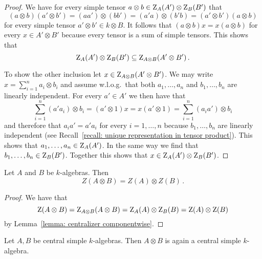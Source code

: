 \begin{proof}
  We have for every simple tensor $a \otimes b \in \operatorname{Z}_A(A') \otimes \operatorname{Z}_B(B')$ that
  \[
      (a \otimes b) (a' \otimes b')
    = (aa') \otimes (bb')
    = (a'a) \otimes (b'b)
    = (a' \otimes b')(a \otimes b)
  \]
  for every simple tensor $a' \otimes b' \in k \otimes B$.
  It follows that $(a \otimes b) x = x (a \otimes b)$ for every $x \in A' \otimes B'$ because every tensor is a sum of simple tensors.
  This shows that
  \[
              \operatorname{Z}_A(A') \otimes \operatorname{Z}_B(B')
    \subseteq \operatorname{Z}_{A \otimes B}(A' \otimes B') \,.
  \]
  
  To show the other inclusion let $x \in \operatorname{Z}_{A \otimes B}(A' \otimes B')$.
  We may write $x = \sum_{i=1}^n a_i \otimes b_i$ and assume w.l.o.g.\ that both $a_1, \dotsc, a_n$ and $b_1, \dotsc, b_n$ are linearly independent.
  For every $a' \in A'$ we then have that
  \[
      \sum_{i=1}^n (a' a_i) \otimes b_i
    = (a' \otimes 1) x
    = x (a' \otimes 1)
    = \sum_{i=1}^n (a_i a') \otimes b_i
  \]
  and therefore that $a_i a' = a' a_i$ for every $i = 1, \dotsc, n$ because $b_1, \dotsc, b_n$ are linearly independent (see Recall~\ref{recall: unique representation in tensor product}).
  This shows that $a_1, \dotsc, a_n \in \operatorname{Z}_{A}(A')$.
  In the same way we find that $b_1, \dotsc, b_n \in \operatorname{Z}_{B}(B')$.
  Together this shows that $x \in \operatorname{Z}_A(A') \otimes \operatorname{Z}_B(B')$.
\end{proof}


\begin{corollary}
  \label{corollary: center of tensor product}
  Let $A$ and $B$ be $k$-algebras.
  Then
  \[
      Z(A \otimes B)
    = Z(A) \otimes Z(B) \,.
  \]
\end{corollary}


\begin{proof}
  We have that
  \[
      \operatorname{Z}(A \otimes B)
    = \operatorname{Z}_{A \otimes B}(A \otimes B)
    = \operatorname{Z}_A(A) \otimes \operatorname{Z}_B(B)
    = \operatorname{Z}(A) \otimes \operatorname{Z}(B)
  \]
  by Lemma~\ref{lemma: centralizer componentwise}.
\end{proof}


\begin{proposition}
  Let $A, B$ be central simple $k$-algebras.
  Then $A \otimes B$ is again a central simple $k$-algebra.
\end{proposition}


